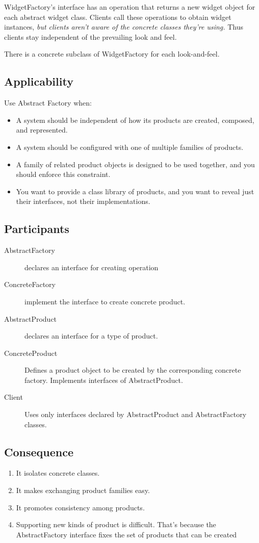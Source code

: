 \documentclass[11pt, a4paper]{book}
\begin{document}
WidgetFactory's interface has an operation that returns a new widget object for
each abstract widget class. Clients call these operations to obtain widget
instances, \emph{but clients aren't aware of the concrete classes they're
using.} Thus clients stay independent of the prevailing look and feel.

There is a concrete subclass of WidgetFactory for each look-and-feel.
\subsection{Applicability}
Use Abstract Factory when:
\begin{itemize}
    \item A system should be independent of how its products are created,
    composed, and represented.
    \item A system should be configured with one of multiple families of
    products.
    \item A family of related product objects is designed to be used together,
    and you should enforce this constraint.
    \item You want to provide a class library of products, and you want to
    reveal just their interfaces, not their implementations.
\end{itemize}
\subsection{Participants}
\begin{description}
    \item [AbstractFactory] declares an interface for creating operation
    \item [ConcreteFactory] implement the interface to create concrete product.
    \item [AbstractProduct] declares an interface for a type of product.
    \item [ConcreteProduct] Defines a product object to be created by the
    corresponding concrete factory. Implements interfaces of AbstractProduct.
    \item [Client] Uses only interfaces declared by AbstractProduct and
    AbstractFactory classes.
\end{description}
\subsection{Consequence}
\begin{enumerate}
    \item It isolates concrete classes.
    \item It makes exchanging product families easy.
    \item It promotes consistency among products.
    \item Supporting new kinds of product is difficult. That's because the
    AbstractFactory interface fixes the set of products that can be created
\end{enumerate}
\end{document}
